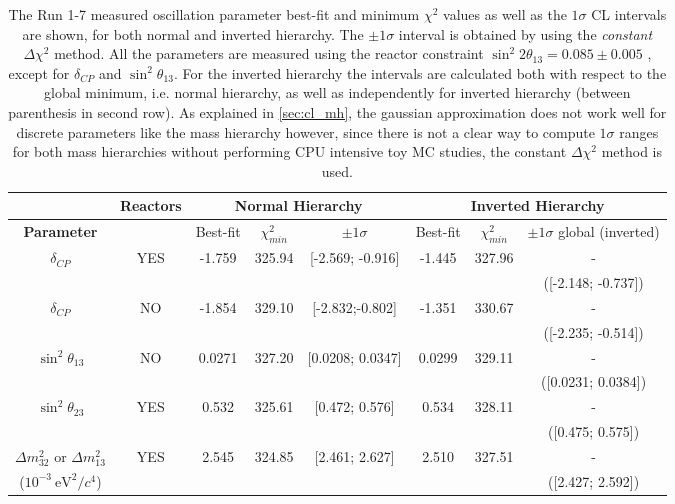 \begin{table}[htb]
\centering
\begin{tabular}{| c | c || c | c | c || c | c | c |}
\hline
								& {\bf Reactors}		& \multicolumn{3}{c||}{\bf Normal Hierarchy} & \multicolumn{3}{c|}{\bf Inverted Hierarchy} \\
\hline										
\bf Parameter						&				& Best-fit	& $\chi^2_{min}$	& $\pm 1\sigma$ 	  	 	& Best-fit		& $\chi^2_{min}$ 	& $\pm 1\sigma$ global (inverted) 	 \\
\hline
$\delta_{CP}$             				& YES      			& -1.759  	& 325.94			& [-2.569; -0.916]			& -1.445		& 327.96			& -							\\
								& 				& 		& 				& 						& 			& 				& ([-2.148; -0.737])				\\ 
\hline
$\delta_{CP}$            				& NO        			& -1.854  	& 329.10			& [-2.832;-0.802]  			& -1.351		& 330.67			& -				\\
								& 				& 		& 				& 						& 			& 				& ([-2.235; -0.514]) 				\\ 
\hline
$\sin^2 \theta_{13}$    				& NO             		& 0.0271  	& 327.20			& [0.0208; 0.0347]	        		& 0.0299		& 329.11			& -							\\
								& 				& 		& 				& 						& 			& 				& ([0.0231; 0.0384]) 				\\ 
\hline
$\sin^2 \theta_{23}$                      		& YES       		& 0.532	& 325.61			& [0.472; 0.576]			& 0.534		& 328.11			& -                 					\\
								& 				& 		& 				& 						& 			& 				& ([0.475; 0.575])			  	\\ 
\hline
$\Delta m^2_{32}$ or $\Delta m^2_{13}$   & YES  			& 2.545 	& 324.85 			& [2.461; 2.627]			& 2.510 		& 327.51			& -     						\\
($10^{-3} ~\text{eV}^2 / c^4$) 			& 				& 		&				&						&			&				& ([2.427; 2.592])				\\

\hline
\end{tabular}
\caption{
The Run 1-7 measured oscillation parameter best-fit
and minimum $\chi^2$ 
values  
as well as the 
$1\sigma$ 
CL intervals are shown,
for both normal and inverted hierarchy. 
The $\pm1\sigma$ interval is obtained by using the 
\emph{constant} $\Delta \chi^2$ method.
All the parameters are measured using the reactor constraint 
$\sin^2 2\theta_{13} = 0.085 \pm 0.005 $
\cite{pdg_2014},
except for $\delta_{CP}$ and $\sin^2 \theta_{13}$.
For the inverted hierarchy the intervals are calculated both with respect to 
the global minimum, i.e. normal hierarchy, as well as 
independently for inverted hierarchy (between parenthesis in second row).
As explained in \cref{sec:cl_mh}, the gaussian approximation does not work well 
for discrete parameters like the mass hierarchy however, since there is not a clear way
to compute $1\sigma$ ranges for both mass hierarchies without performing
CPU intensive toy MC studies, the constant $\Delta \chi^2$ method is used.
}                                                                                                                                                                                          
\label{tab:joint_bestfit_run17}
\end{table}
